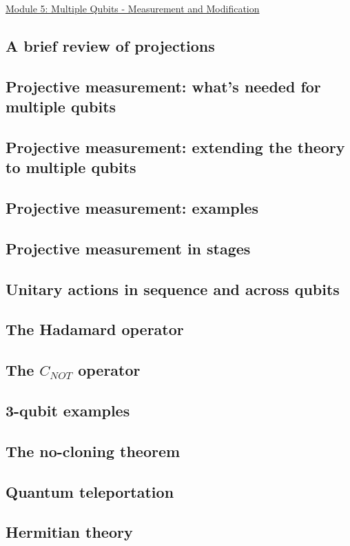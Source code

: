 \documentclass[main.tex]{subfiles}
\begin{document}
\href{https://www2.seas.gwu.edu/~simhaweb/quantum/modules/module5/module5.html}{Module 5: Multiple Qubits - Measurement and Modification}

\subsection{A brief review of projections}

\subsection{Projective measurement: what's needed for multiple qubits}

\subsection{Projective measurement: extending the theory to multiple qubits}

\subsection{Projective measurement: examples}

\subsection{Projective measurement in stages}

\subsection{Unitary actions in sequence and across qubits}

\subsection{The Hadamard operator}

\subsection{The $C_{NOT}$ operator}

\subsection{3-qubit examples}

\subsection{The no-cloning theorem}

\subsection{Quantum teleportation}

\subsection{Hermitian theory}
\end{document}
